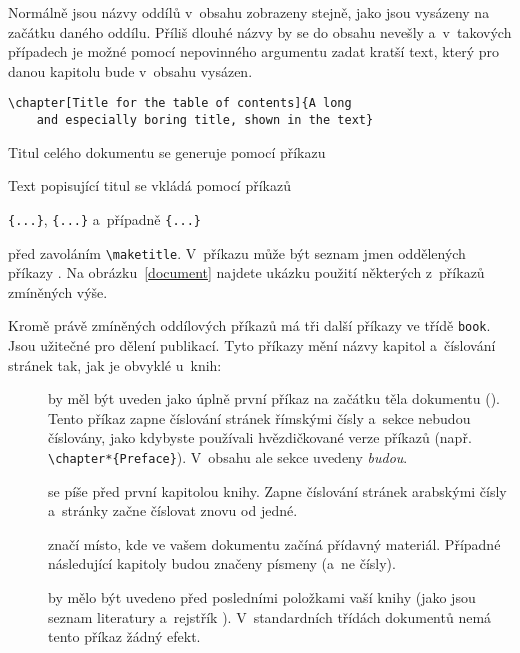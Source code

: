 Normálně jsou názvy oddílů v~obsahu zobrazeny stejně, jako jsou
vysázeny na začátku daného oddílu. Příliš dlouhé názvy by se do obsahu
nevešly a~v~takových případech je možné pomocí nepovinného argumentu
zadat kratší text, který pro danou kapitolu bude v~obsahu vysázen.

\begin{code}
\verb|\chapter[Title for the table of contents]{A long|\\
\verb|    and especially boring title, shown in the text}|
\end{code} 

Titul celého dokumentu se generuje pomocí příkazu
\begin{lscommand}
\end{lscommand}
\noindent Text popisující titul se vkládá pomocí příkazů
\begin{lscommand}
\verb|{...}|, \verb|{...}| 
a~případně \verb|{...}| 
\end{lscommand}
\noindent před zavoláním \verb|\maketitle|. V~příkazu  může být seznam jmen
oddělených příkazy . 
%
Na obrázku~\ref{document} najdete ukázku použití některých z~příkazů
zmíněných výše.

Kromě právě zmíněných oddílových příkazů má \LaTeXe{} tři další
příkazy ve třídě \verb|book|. Jsou užitečné pro dělení publikací.
Tyto příkazy mění názvy kapitol a~číslování stránek tak, jak
je obvyklé u~knih:

\begin{description}
\item[] by měl být uveden jako úplně první příkaz
  na začátku těla dokumentu (\verb||). Tento
  příkaz zapne číslování stránek římskými čísly a~sekce nebudou
  číslovány, jako kdybyste používali hvězdičkované verze příkazů
  (např. \verb|\chapter*{Preface}|). V~obsahu ale sekce uvedeny
  \emph{budou}.
\item[] se píše před první kapitolou knihy. Zapne
  číslování stránek arabskými čísly a~stránky začne číslovat
  znovu od jedné.
\item[] značí místo, kde ve vašem dokumentu začíná
  přídavný materiál. Případné následující kapitoly budou značeny
  písmeny (a~ne čísly).
\item[] by mělo být uvedeno před posledními položkami
  vaší knihy (jako jsou seznam literatury a~rejstřík%
). V~standardních třídách
  dokumentů nemá tento příkaz žádný efekt.
\end{description}


